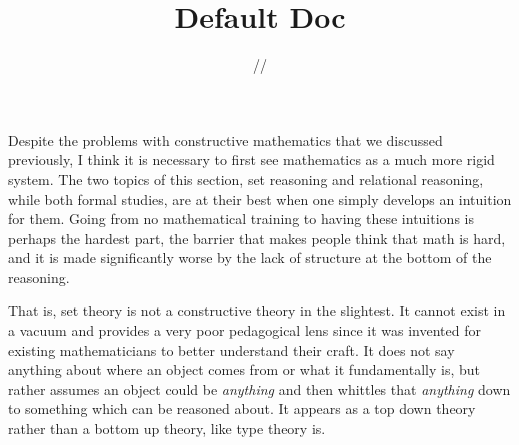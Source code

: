 \documentclass[11pt]{article}
\title{\textbf{Default Doc}}
\date{\the\day/\the\month/\the\year}
\begin{document}
%
%	


Despite the problems with constructive mathematics that we discussed previously, I think it is necessary to first see mathematics as a much more rigid system. The two topics of this section, set reasoning and relational reasoning, while both formal studies, are at their best when one simply develops an intuition for them. Going from no mathematical training to having these intuitions is perhaps the hardest part, the barrier that makes people think that math is hard, and it is made significantly worse by the lack of structure at the bottom of the reasoning.

That is, set theory is not a constructive theory in the slightest. It cannot exist in a vacuum and provides a very poor pedagogical lens since it was invented for existing mathematicians to better understand their craft. It does not say anything about where an object comes from or what it fundamentally is, but rather assumes an object could be \emph{anything} and then whittles that \emph{anything} down to something which can be reasoned about. It appears as a top down theory rather than a bottom up theory, like type theory is.
\end{document}
